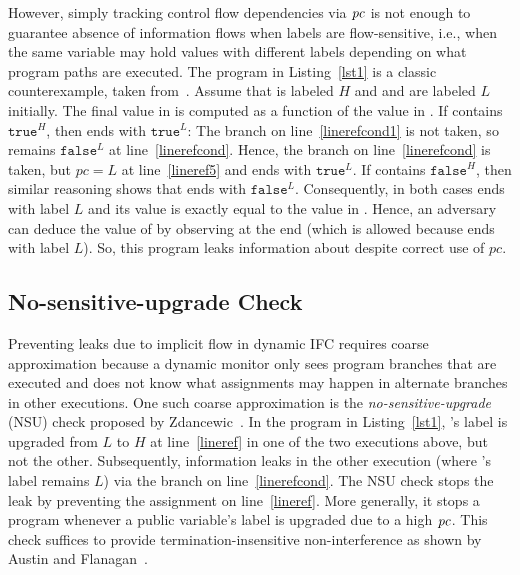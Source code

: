However, simply tracking control flow dependencies via $\mathit{pc}$ is not
enough to guarantee absence of information flows when labels are
flow-sensitive, i.e., when the same variable may hold values with
different labels depending on what program paths are executed. The
program in Listing~\ref{lst1} is a classic counterexample, taken
from~\cite{plas09}. Assume that  is labeled $H$ and  and  are
labeled $L$ initially. The final value in  is computed as a function
of the value in . If  contains $\texttt{true}^H$, then  ends
with $\texttt{true}^L$: The branch on line~\ref{linerefcond1} is not
taken, so  remains $\texttt{false}^L$ at
line~\ref{linerefcond}. Hence, the branch on line~\ref{linerefcond} is
taken, but $pc = L$ at line~\ref{lineref5} and  ends with
$\texttt{true}^L$. If  contains $\texttt{false}^H$, then similar
reasoning shows that  ends with $\texttt{false}^L$. Consequently,
in both cases  ends with label $L$ and its value is exactly equal
to the value in . Hence, an adversary can deduce the value of 
by observing  at the end (which is allowed because  ends with
label $L$). So, this program leaks information about  despite
correct use of $pc$.

\subsection{No-sensitive-upgrade Check}
\label{sec:bg-nsu}
Preventing leaks due to implicit flow in dynamic IFC requires coarse
approximation because a dynamic monitor only sees program branches
that are executed and does not know what assignments may happen in
alternate branches in other executions. One such coarse approximation
is the \emph{no-sensitive-upgrade} (NSU) check proposed by
Zdancewic~\cite{zdancewic02PhD}. In the program in Listing~\ref{lst1},
's label is upgraded from $L$ to $H$ at line~\ref{lineref} in one of
the two executions above, but not the other. Subsequently, information
leaks in the other execution (where 's label remains $L$) via the
branch on line~\ref{linerefcond}. The NSU check stops the leak by
preventing the assignment on line~\ref{lineref}. More generally, it
stops a program whenever a public variable's label is upgraded due to
a high $\mathit{pc}$. This check suffices to provide termination-insensitive
non-interference as shown by Austin and Flanagan~\cite{plas09}. 

